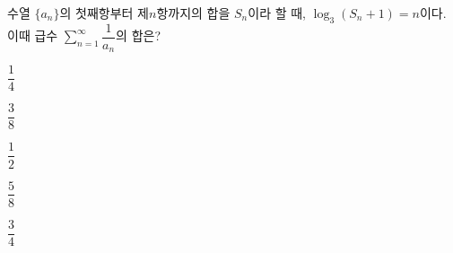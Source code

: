 수열 $\{a_n\}$의 첫째항부터 제$n$항까지의 합을 $S_n$이라 할 때, $\log_3(S_n+1)=n$이다. 이때 급수 $\displaystyle\sum_{n=1}^{\infty}\dfrac{1}{a_n}$의 합은?
\begin{choices32}{\rule[-3ex]{0pt}{8ex}$\dfrac{1}{4}$}{\rule[-3ex]{0pt}{8ex}$\dfrac{3}{8}$}{\rule[-3ex]{0pt}{8ex}$\dfrac{1}{2}$}{\rule[-3ex]{0pt}{8ex}$\dfrac{5}{8}$}{\rule[-3ex]{0pt}{8ex}$\dfrac{3}{4}$}\end{choices32}
